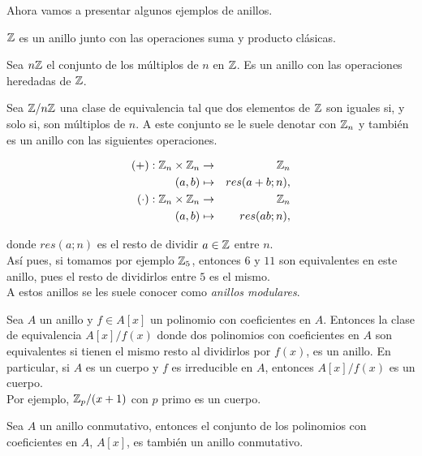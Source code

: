 Ahora vamos a presentar algunos ejemplos de anillos.

\begin{ejemplo}
	$\mathbb{Z}$ es un anillo junto con las operaciones suma y producto clásicas.
\end{ejemplo}

\begin{ejemplo}
	Sea $n\mathbb{Z}$ el conjunto de los múltiplos de $n$ en $\mathbb{Z}$. Es un anillo con las operaciones heredadas de $\mathbb{Z}$.
\end{ejemplo}

\begin{ejemplo}
	Sea $\mathbb{Z}/n\mathbb{Z}$ una clase de equivalencia tal que dos elementos de $\mathbb{Z}$ son iguales si, y solo si, son múltiplos de $n$. A este conjunto se le suele denotar con $\mathbb{Z}_n$ y también es un anillo con las siguientes operaciones.
	
	\begin{alignat}{2}
	(+): \mathbb{Z}_n \times \mathbb{Z}_n & \to & \mathbb{Z}_n \\
	(a, b) & \mapsto & res(a+b; n), \\
	(\cdot): \mathbb{Z}_n \times \mathbb{Z}_n & \to & \mathbb{Z}_n \\
	(a, b) & \mapsto & res(ab; n),
	\end{alignat}
	
	donde $res(a; n)$ es el resto de dividir $a \in \mathbb{Z}$ entre $n$.\\
	
	Así pues, si tomamos por ejemplo $\mathbb{Z}_5$, entonces $6$ y $11$ son equivalentes en este anillo, pues el resto de dividirlos entre $5$ es el mismo.\\
	
	A estos anillos se les suele conocer como \textit{anillos modulares}.
\end{ejemplo}

\begin{ejemplo}
	Sea $A$ un anillo y $f \in A[x]$ un polinomio con coeficientes en $A$. Entonces la clase de equivalencia $A[x]/f(x)$ donde dos polinomios con coeficientes en $A$ son equivalentes si tienen el mismo resto al dividirlos por $f(x)$, es un anillo. En particular, si $A$ es un cuerpo y $f$ es irreducible en $A$, entonces $A[x]/f(x)$ es un cuerpo.\\
	
	Por ejemplo, $\mathbb{Z}_p/(x+1)$ con $p$ primo es un cuerpo.
\end{ejemplo}

\begin{ejemplo}
	Sea $A$ un anillo conmutativo, entonces el conjunto de los polinomios con coeficientes en $A$, $A[x]$, es también un anillo conmutativo.
\end{ejemplo}

